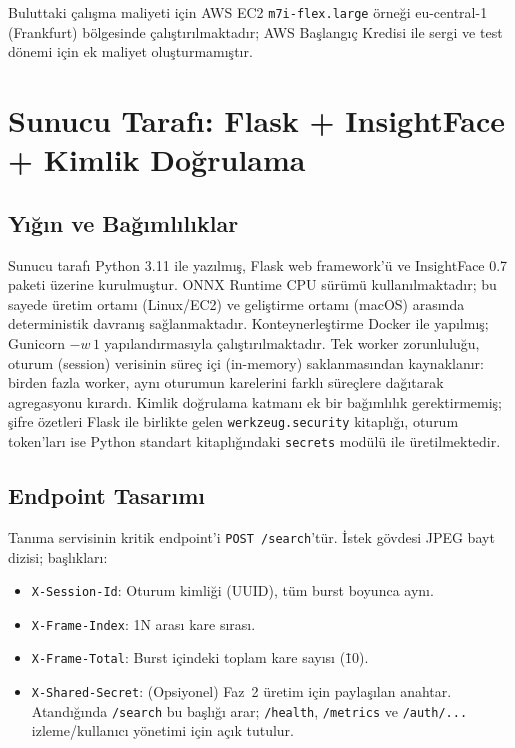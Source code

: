 Buluttaki çalışma maliyeti için AWS EC2 \texttt{m7i-flex.large}
örneği eu-central-1 (Frankfurt) bölgesinde çalıştırılmaktadır;
AWS Başlangıç Kredisi ile sergi ve test dönemi için ek maliyet
oluşturmamıştır.

\section{Sunucu Tarafı: Flask + InsightFace + Kimlik Doğrulama}
\label{sec:sunucu-impl}

\subsection{Yığın ve Bağımlılıklar}

Sunucu tarafı Python 3.11 ile yazılmış, Flask web framework'ü ve
InsightFace 0.7 paketi üzerine kurulmuştur. ONNX Runtime CPU sürümü
kullanılmaktadır; bu sayede üretim ortamı (Linux/EC2) ve geliştirme
ortamı (macOS) arasında deterministik davranış sağlanmaktadır.
Konteynerleştirme Docker ile yapılmış; Gunicorn $-w\,1$ yapılandırmasıyla
çalıştırılmaktadır. Tek worker zorunluluğu, oturum (session) verisinin
süreç içi (in-memory) saklanmasından kaynaklanır: birden fazla worker,
aynı oturumun karelerini farklı süreçlere dağıtarak agregasyonu kırardı.
Kimlik doğrulama katmanı ek bir bağımlılık gerektirmemiş; şifre özetleri
Flask ile birlikte gelen \texttt{werkzeug.security} kitaplığı,
oturum token'ları ise Python standart kitaplığındaki \texttt{secrets}
modülü ile üretilmektedir.

\subsection{Endpoint Tasarımı}

Tanıma servisinin kritik endpoint'i \texttt{POST /search}'tür. İstek
gövdesi JPEG bayt dizisi; başlıkları:

\begin{itemize}
    \item \texttt{X-Session-Id}: Oturum kimliği (UUID), tüm burst boyunca aynı.
    \item \texttt{X-Frame-Index}: 1\textendash N arası kare sırası.
    \item \texttt{X-Frame-Total}: Burst içindeki toplam kare sayısı (\=10).
    \item \texttt{X-Shared-Secret}: (Opsiyonel) Faz~2 üretim için
          paylaşılan anahtar. Atandığında \texttt{/search}
          bu başlığı arar; \texttt{/health}, \texttt{/metrics} ve
          \texttt{/auth/...} izleme/kullanıcı yönetimi için açık tutulur.
\end{itemize}

